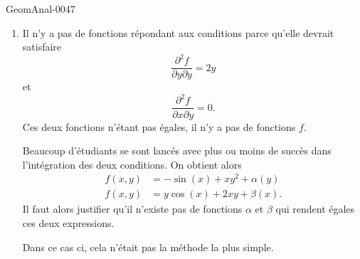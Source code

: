 \begin{corrige}{GeomAnal-0047}

    \begin{enumerate}
        \item
            Il n'y a pas de fonctions répondant aux conditions parce qu'elle devrait satisfaire
            \begin{equation}
                \frac{ \partial^2f  }{ \partial y\partial y }=2y
            \end{equation}
            et
            \begin{equation}
                \frac{ \partial^2f  }{ \partial x\partial y }=0.
            \end{equation}
            Ces deux fonctions n'étant pas égales, il n'y a pas de fonctions \( f\).

            \begin{remark}
                Beaucoup d'étudiants se sont lancés avec plus ou moins de succès dans l'intégration des deux conditions. On obtient alors
                \begin{subequations}
                    \begin{align}
                        f(x,y)&=-\sin(x)+xy^2+\alpha(y)\\
                        f(x,y)&=y\cos(x)+2xy+\beta(x).
                    \end{align}
                \end{subequations}
                Il faut alors justifier qu'il n'existe pas de fonctions \( \alpha\) et \( \beta\) qui rendent égales ces deux expressions.

                Dans ce cas ci, cela n'était pas la méthode la plus simple.
            \end{remark}


\end{enumerate}
\end{corrige}
